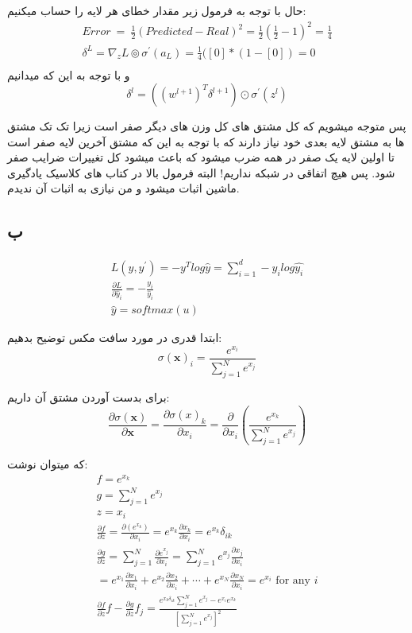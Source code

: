 \documentclass{article}[12pt]
\begin{document}
حال با توجه به فرمول زیر مقدار خطای هر لایه را حساب میکنیم:
\begin{gather*}
	Error\ =\ \frac{1}{2}( Predicted-Real)^{2} =\frac{1}{2}\left(\frac{1}{2} -1\right)^{2} =\frac{1}{4}\\
	\delta ^{L} =\nabla _{z} L\circledcirc \sigma ^{\prime }( a_{L}) =\frac{1}{4}([ 0] *( 1-[ 0]) =0\\
\end{gather*}
و با توجه به این که میدانیم 
\begin{equation*}
	\delta^{l}=\left(\left(w^{l+1}\right)^{T} \delta^{l+1}\right) \odot \sigma^{\prime}\left(z^{l}\right)
\end{equation*}

پس متوجه میشویم که کل مشتق های کل وزن های دیگر صفر است زیرا تک تک مشتق ها به مشتق لایه بعدی خود نیاز دارند که با توجه به این که مشتق آخرین لایه صفر است تا اولین لایه یک صفر در همه ضرب میشود که باعث میشود کل تغییرات ضرایب صفر شود. پس هیچ اتفاقی در شبکه نداریم! البته فرمول بالا در کتاب های کلاسیک یادگیری ماشین اثبات میشود و من نیازی به اثبات آن ندیدم. 

\subsection{ب}

\begin{gather*}
	L\left( y,y^{\prime }\right) =-y^{T} log\hat{y} =\sum _{i=1}^{d} -y_{i} log\widehat{y_{i}}\\
	\frac{\partial L}{\partial \hat{y}_{i}} =-\frac{y_{i}}{\hat{y}_{i}}\\
	\hat{y} =softmax( u)
\end{gather*}

ابتدا قدری در مورد سافت مکس توضیح بدهیم:
$$
\sigma(\mathbf{x})_{i}=\frac{e^{x_{i}}}{\sum_{j=1}^{N} e^{x_{j}}}
$$

برای بدست آوردن مشتق آن داریم:
$$
\frac{\partial \sigma(\mathbf{x})}{\partial \mathbf{x}}=\frac{\partial \sigma(x)_{k}}{\partial x_{i}}=\frac{\partial}{\partial x_{i}}\left(\frac{e^{x_{k}}}{\sum_{j=1}^{N} e^{x_{j}}}\right)
$$

که میتوان نوشت:
\begin{gather*}
	f=e^{x_{k}} \\
	g=\sum_{j=1}^{N} e^{x_{j}} \\
	z=x_{i} \\
	\frac{\partial f}{\partial z}=\frac{\partial\left(e^{x_{k}}\right)}{\partial x_{i}}=e^{x_{k}} \frac{\partial x_{k}}{\partial x_{i}}=e^{x_{k}} \delta_{i k} \\
	\frac{\partial g}{\partial z}=\sum_{j=1}^{N} \frac{\partial e^{x_{j}}}{\partial x_{i}}=\sum_{j=1}^{N} e^{x_{j}} \frac{\partial x_{j}}{\partial x_{i}} \\
	=e^{x_{1}} \frac{\partial x_{1}}{\partial x_{i}}+e^{x_{2}} \frac{\partial x_{2}}{\partial x_{i}}+\cdots+e^{x_{N}} \frac{\partial x_{N}}{\partial x_{i}}=e^{x_{i}} \text { for any } i \\
	\frac{\partial f}{\partial z} f-\frac{\partial g}{\partial z} f_{j}=\frac{e^{x_{k} \delta_{i k}} \sum_{j=1}^{N} e^{x_{j}}-e^{x_{i}} e^{x_{k}}}{\left[\sum_{j=1}^{N} e^{x_{j}}\right]^{2}}
\end{gather*}
\end{document}
